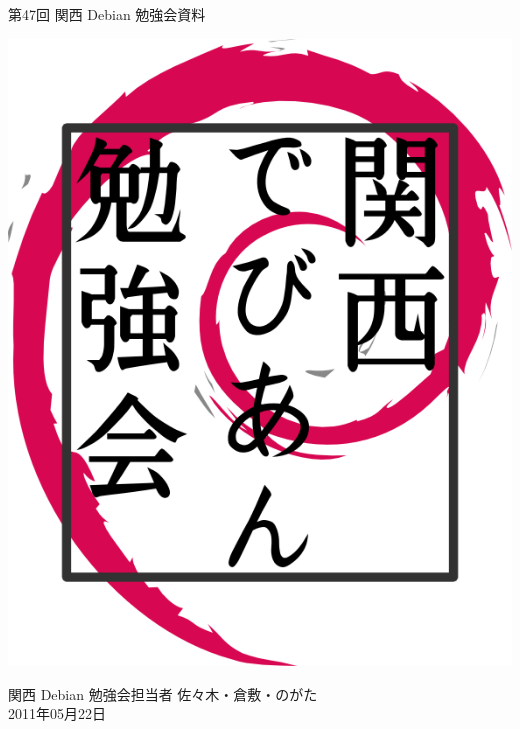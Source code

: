 \documentclass[mingoth,a4paper]{jsarticle}
\newcommand{\debmtgyear}{2011}
\newcommand{\debmtgdate}{22}
\newcommand{\debmtgmonth}{05}
\newcommand{\debmtgnumber}{47}
\begin{document}
\begin{titlepage}


 第\debmtgnumber{}回 関西 Debian 勉強会資料

\vspace{2cm}

\begin{center}
\includegraphics{image200802/kansaidebianlogo.png}
\end{center}

\begin{flushright}
\hfill{}関西 Debian 勉強会担当者 佐々木・倉敷・のがた \\
\hfill{}\debmtgyear{}年\debmtgmonth{}月\debmtgdate{}日
\end{flushright}

\thispagestyle{empty}
\end{titlepage}


\subsection*{}%
\end{document}
